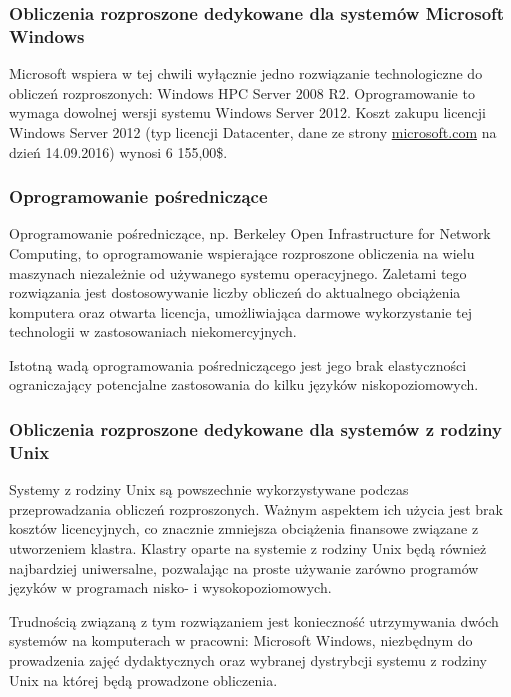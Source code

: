 \documentclass{article}
\begin{document}
\subsubsection{Obliczenia rozproszone dedykowane dla systemów Microsoft Windows}

Microsoft wspiera w tej chwili wyłącznie jedno rozwiązanie technologiczne do 
obliczeń rozproszonych: Windows HPC Server 2008 R2. Oprogramowanie to wymaga 
dowolnej wersji systemu Windows Server 2012. Koszt zakupu licencji 
Windows Server 2012 (typ licencji Datacenter, dane ze strony 
\url{microsoft.com} na dzień 14.09.2016) wynosi 6 155,00\$.

\subsubsection{Oprogramowanie pośredniczące}

Oprogramowanie pośredniczące, np. Berkeley Open Infrastructure for Network 
Computing, to oprogramowanie wspierające rozproszone obliczenia na wielu 
maszynach niezależnie od używanego systemu operacyjnego. Zaletami tego 
rozwiązania jest dostosowywanie liczby obliczeń do aktualnego obciążenia 
komputera oraz otwarta licencja, umożliwiająca darmowe wykorzystanie tej 
technologii w zastosowaniach niekomercyjnych. 

Istotną wadą oprogramowania pośredniczącego jest jego brak elastyczności 
ograniczający potencjalne zastosowania do kilku języków niskopoziomowych.

\subsubsection{Obliczenia rozproszone dedykowane dla systemów z rodziny Unix}

Systemy z rodziny Unix są powszechnie wykorzystywane podczas przeprowadzania 
obliczeń rozproszonych. Ważnym aspektem ich użycia jest brak kosztów 
licencyjnych, co znacznie zmniejsza obciążenia finansowe związane z utworzeniem 
klastra. Klastry oparte na systemie z rodziny Unix będą również najbardziej 
uniwersalne, pozwalając na proste używanie zarówno programów języków w 
programach nisko- i wysokopoziomowych.

Trudnością związaną z tym rozwiązaniem jest konieczność utrzymywania dwóch 
systemów na komputerach w pracowni: Microsoft Windows, niezbędnym do 
prowadzenia zajęć dydaktycznych oraz wybranej dystrybcji systemu z rodziny Unix 
na której będą prowadzone obliczenia.
\end{document}
